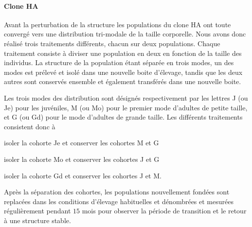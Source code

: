 \paragraph{Clone HA} Avant la perturbation de la structure les populations du
clone HA ont toute convergé vers une distribution tri-modale de la taille
corporelle. Nous avons donc réalisé trois traitements différents, chacun sur
deux populations. Chaque traitement consiste à diviser une population en deux en
fonction de la taille des individus. La structure de la population étant séparée
en trois modes, un des modes est prélevé et isolé dans une nouvelle boite
d'élevage, tandis que les deux autres sont conservés ensemble et également
transférés dans une nouvelle boite.

Les trois modes des distribution sont désignés respectivement par les lettres J
(ou Je) pour les juvéniles, M (ou Mo) pour le premier mode d'adultes de petite
taille, et G (ou Gd) pour le mode d'adultes de grande taille. Les différents
traitements consistent donc à \begin{enumerate*}[label=(\roman*), before=\unskip{ : }, itemjoin={{ ; }},
itemjoin*={{ ; et }}]
\item isoler la cohorte Je et conserver les cohortes M et G
\item isoler la cohorte Mo et conserver les cohortes J et G
\item isoler la cohorte Gd et conserver les cohortes J et M.
\end{enumerate*} 
Après la séparation des cohortes, les populations nouvellement fondées sont
replacées dans les conditions d'élevage habituelles et dénombrées et mesurées
régulièrement pendant $15$ mois pour observer la période de transition et le
retour à une structure stable. 

